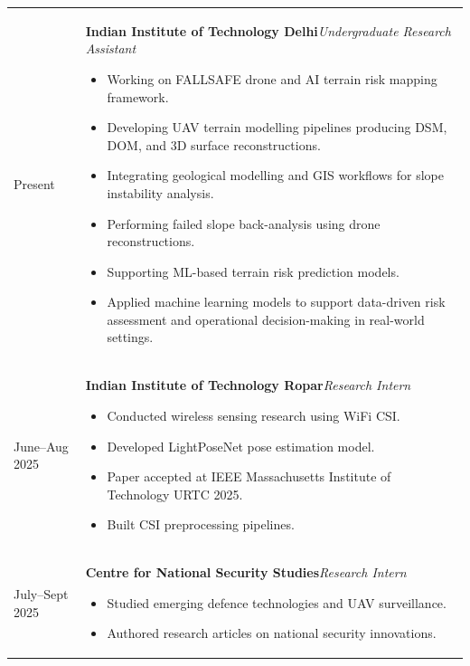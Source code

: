 \documentclass[11pt]{article}
\begin{document}
\begingroup
\renewcommand{\arraystretch}{1.1}
\begin{tabularx}{\textwidth}{@{}p{95pt}X@{}}

{\small\color{namegray}Present} &
\textbf{Indian Institute of Technology Delhi}\hfill\textit{Undergraduate Research Assistant}

\begin{itemize}[leftmargin=*,nosep]
\item Working on FALLSAFE drone and AI terrain risk mapping framework.
\item Developing UAV terrain modelling pipelines producing DSM, DOM, and 3D surface reconstructions.
\item Integrating geological modelling and GIS workflows for slope instability analysis.
\item Performing failed slope back-analysis using drone reconstructions.
\item Supporting ML-based terrain risk prediction models.
\item Applied machine learning models to support data-driven risk assessment and operational decision-making in real-world settings.

\end{itemize}
\\[6pt]

{\small\color{namegray}June--Aug 2025} &
\textbf{Indian Institute of Technology Ropar}\hfill\textit{Research Intern}

\begin{itemize}[leftmargin=*,nosep]
\item Conducted wireless sensing research using WiFi CSI.
\item Developed LightPoseNet pose estimation model.
\item Paper accepted at IEEE Massachusetts Institute of Technology URTC 2025.
\item Built CSI preprocessing pipelines.
\end{itemize}
\\[6pt]

{\small\color{namegray}July--Sept 2025} &
\textbf{Centre for National Security Studies}\hfill\textit{Research Intern}

\begin{itemize}[leftmargin=*,nosep]
\item Studied emerging defence technologies and UAV surveillance.
\item Authored research articles on national security innovations.
\end{itemize}

\end{tabularx}
\endgroup
\end{document}
